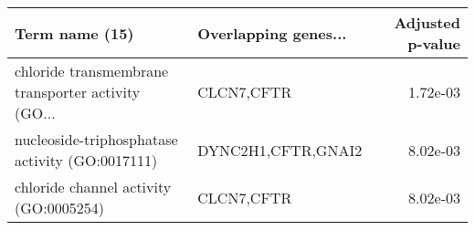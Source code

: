 \begin{tabular}{llr}
\toprule
                                    Term name (15) & Overlapping genes... &  Adjusted p-value \\
\midrule
chloride transmembrane transporter activity (GO... &           CLCN7,CFTR &          1.72e-03 \\
   nucleoside-triphosphatase activity (GO:0017111) &   DYNC2H1,CFTR,GNAI2 &          8.02e-03 \\
            chloride channel activity (GO:0005254) &           CLCN7,CFTR &          8.02e-03 \\
\bottomrule
\end{tabular}
